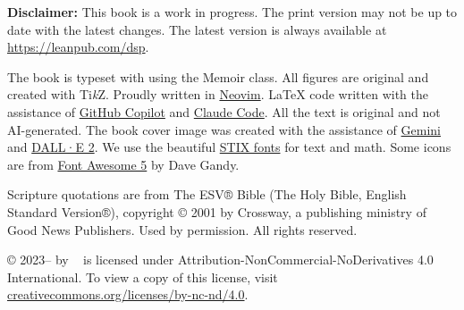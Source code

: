 \documentclass[print,gray]{dspbook}
\begin{document}
\vfill

{
  \footnotesize\noindent
  \textbf{Disclaimer:} This book is a work in progress.  The print version may not be up
  to date with the latest changes.  The latest version is always available at
  \url{https://leanpub.com/dsp}.
}

\vspace{0.5cm}
{
\footnotesize\noindent
The book is typeset with \XeTeX{} using the Memoir class.  All figures are
original and created with Ti\textit{k}Z.  Proudly written in
\href{https://neovim.io/}{Neovim}.  \LaTeX{} code written with the assistance of
\href{https://github.com/features/copilot}{GitHub Copilot} and
\href{https://www.anthropic.com/claude-code}{Claude Code}.
All the text is original and not AI-generated.
The book cover image was created with the assistance of
\href{https://gemini.google.com}{Gemini} and \href{https://openai.com/dall-e-2}{DALL·E 2}.
We use the beautiful \href{https://www.stixfonts.org/}{STIX fonts} for text and math.
Some icons are from \href{https://fontawesome.com/}{Font Awesome 5} by Dave Gandy.
}

\vspace{0.5cm}
{
\footnotesize\noindent
Scripture quotations are from The ESV® Bible (The Holy Bible, English Standard Version®),
copyright © 2001 by Crossway, a publishing ministry of Good News Publishers. Used by
permission. All rights reserved.
}

\vspace{0.5cm}
{
\footnotesize\noindent
\thetitle{} © 2023--\the\year{} by \theauthor{}~ is licensed under
Attribution-NonCommercial-NoDerivatives 4.0 International. To view a copy of this license,
visit
\href{http://creativecommons.org/licenses/by-nc-nd/4.0/}{creativecommons.org/licenses/by-nc-nd/4.0}.
}

\cleardoublepage



\cleardoublepage



\cleardoublepage

\tableofcontents

\cleardoublepage

\mainmatter










\backmatter

\startappendices




\printglossary

\printbibliography[heading=bibintoc]
\end{document}
